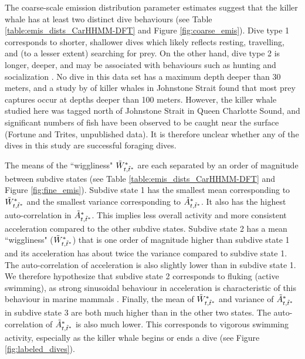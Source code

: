 The coarse-scale emission distribution parameter estimates suggest that the killer whale has at least two distinct dive behaviours (see Table \ref{table:emis_dists_CarHHMM-DFT} and Figure \ref{fig:coarse_emis}). 
Dive type 1 corresponds to shorter, shallower dives which likely reflects resting, travelling, and (to a lesser extent) searching for prey.
On the other hand, dive type 2 is longer, deeper, and may be associated with behaviours such as hunting and socialization \citep{Tennessen:2019b}. No dive in this data set has a maximum depth deeper than 30 meters, and a study by \citet{Wright:2017} of killer whales in Johnstone Strait found that most prey captures occur at depths deeper than 100 meters. However, the killer whale studied here was tagged north of Johnstone Strait in Queen Charlotte Sound, and significant numbers of fish have been observed to be caught near the surface (Fortune and Trites, unpublished data). It is therefore unclear whether any of the dives in this study are successful foraging dives.

The means of the ``wiggliness" $\tilde{W}^*_{t,\tilde t^*}$ are each separated by an order of magnitude between subdive states (see Table \ref{table:emis_dists_CarHHMM-DFT} and Figure \ref{fig:fine_emis}). 
Subdive state 1 has the smallest mean corresponding to $\tilde{W}^*_{t,\tilde t^*}$ and the smallest variance corresponding to $\tilde{A}^*_{t,\tilde t^*}$. It also has the highest auto-correlation in $\tilde{A}^*_{t,\tilde t^*}$. This implies less overall activity and more consistent acceleration compared to the other subdive states. 
Subdive state 2 has a mean ``wiggliness" ($\tilde{W}^*_{t,\tilde t^*}$) that is one order of magnitude higher than subdive state 1 and its acceleration has about twice the variance compared to subdive state 1. The auto-correlation of acceleration is also slightly lower than in subdive state 1. We therefore hypothesize that subdive state 2 corresponds to fluking (active swimming), as strong sinusoidal behaviour in acceleration is characteristic of this behaviour in marine mammals \citep{Simon:2012}.
Finally, the mean of $\tilde{W}^*_{t,\tilde t^*}$ and variance of $\tilde{A}^*_{t,\tilde t^*}$ in subdive state 3 are both much higher than in the other two states. The auto-correlation of $\tilde{A}^*_{t,\tilde t^*}$ is also much lower. This corresponds to vigorous swimming activity, especially as the killer whale begins or ends a dive (see Figure \ref{fig:labeled_dives}). 

